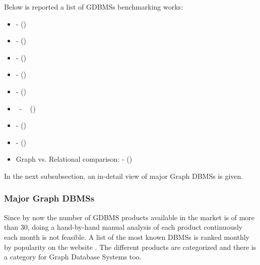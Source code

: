 Below is reported a list of GDBMSs benchmarking works:
 \begin{itemize}[noitemsep]
	\item {} - \citeauthor{BestaPeterGerstenbergerFischerPodstawskiBarthelsAlonsoHoefler2019} (\citeyear{BestaPeterGerstenbergerFischerPodstawskiBarthelsAlonsoHoefler2019}) 
	\item {} - \citeauthor{DayarathnaSuzumura2012} (\citeyear{DayarathnaSuzumura2012}) 
	\item {} - \citeauthor{CiglanAverbuchHluchy2012} (\citeyear{CiglanAverbuchHluchy2012}) 
	\item {} - \citeauthor{BeisPapadopoulosKompatsiaris2015} (\citeyear{BeisPapadopoulosKompatsiaris2015}) 
	\item {} - \citeauthor{JouiliVansteenberghe2013} (\citeyear{JouiliVansteenberghe2013}) 
	\item {} \ - \ \citeauthor{ArangoDBWeinbergerPerformance2015} (\citeyear{ArangoDBWeinbergerPerformance2015}) 
	\item {} - \citeauthor{W3CRdfStoreBenchmarking2021} (\citeyear{W3CRdfStoreBenchmarking2021}) 
	\item {} - \citeauthor{W3CLargeTripleStores2021} (\citeyear{W3CLargeTripleStores2021}) 
	\item Graph vs. Relational comparison:  - \citeauthor{ArangoDBWeinbergerBenchmark2015} (\citeyear{ArangoDBWeinbergerBenchmark2015}) 
\end{itemize}

In the next subsubsection, an in-detail view of major Graph DBMSs is given.

\subsubsection{Major Graph DBMSs} \label{subsubsection:LiteratureReview/ReviewofGraphDatabaseSystems/GDBMSscomparison/MajorGraphDBMSs}
Since by now the number of GDBMS products available in the market is of more than 30, doing a hand-by-hand manual analysis of each product continuously each month is not feasible.
A list of the most known DBMSs is ranked monthly by popularity on the website .
The different products are categorized and there is a category for Graph Database Systems too.

